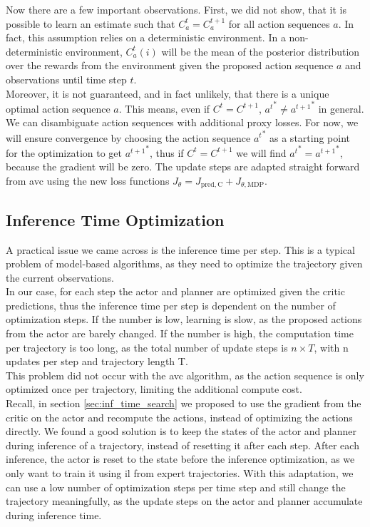 Now there are a few important observations. First, we did not show, that it is possible to learn an estimate such that $C_a^t = C_a^{t+1}$ for all action sequences $a$. 
In fact, this assumption relies on a deterministic 
environment. In a non-deterministic environment, $C_a^t(i)$ will be the mean of the posterior distribution over the rewards from the environment given the proposed action sequence $a$ 
and observations until time step $t$. \\

Moreover, it is not guaranteed, and in fact unlikely, that there is a unique optimal action sequence $a$. This means, even if $C^t = C^{t+1}$, ${a^t}^* \neq {a^{t+1}}^*$ in general. We can 
disambiguate action sequences with additional proxy losses. 
For now, we will ensure convergence by choosing the action sequence ${a^t}^*$ as a starting point for the optimization to get ${a^{t+1}}^*$, thus if $C^t = C^{t+1}$ we will find 
${a^t}^* = {a^{t+1}}^*$, because the gradient will be zero. 
The update 
steps are adapted straight forward from \ac{avc} using the new loss functions $J_{\theta} = J_{\mathrm{pred, C}} + J_{\theta, \mathrm{MDP}}$. 

\subsection{Inference Time Optimization}
A practical issue we came across is the inference time per step. This is a typical problem of model-based algorithms, as they need to optimize the trajectory given 
the current observations.\\ 

In our case, for each step the actor and planner are optimized given the critic predictions, thus the inference time 
per step is dependent on the number of optimization steps. If the number is low, learning is slow, as the proposed actions from the actor are barely changed. 
If the number is high, the computation time per trajectory is too long, as the total number of update steps is $n \times T$, with n updates per step and trajectory length 
T.\\ 

This problem did not occur with the \ac{avc} algorithm, as the action sequence is only optimized 
once per trajectory, limiting the additional compute cost.\\

Recall, in section \ref{sec:inf_time_search} we proposed to use the gradient from the critic on the actor and recompute the 
actions, instead of optimizing the actions directly. We found a good solution is to keep the states of the actor and planner during inference of a trajectory, 
instead of resetting it after each step. After each inference, the actor is reset to the state before the inference optimization, as we only want to 
train it using \ac{il} from expert trajectories. With this adaptation, we can use a low number of optimization steps per time step and still change the trajectory meaningfully, 
as the update steps on the actor and planner accumulate during inference time.
     
